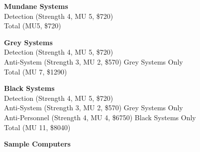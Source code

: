 \documentclass[11pt,twoside,a4paper]{article}
\newenvironment{local_enumerate}{
\begin{enumerate}
     \setlength{\itemsep}{1pt}
     \setlength{\parskip}{0pt}
     \setlength{\parsep}{0pt}}
{\end{enumerate}
}
\begin{document}
\begin{multicols}{2}
\begin{local_enumerate}
	\item \textbf{Mundane Systems}~\\
		Detection (Strength 4, MU 5, \$720)~\\
		Total (MU5, \$720)
	\item \textbf{Grey Systems}~\\
		Detection (Strength 4, MU 5, \$720)~\\
		Anti-System (Strength 3, MU 2, \$570) Grey Systems Only~\\
		Total (MU 7, \$1290)
	\item \textbf{Black Systems}~\\
		Detection (Strength 4, MU 5, \$720)~\\
		Anti-System (Strength 3, MU 2, \$570) Grey Systems Only~\\
		Anti-Personnel (Strength 4, MU 4, \$6750) Black Systems Only~\\
		Total (MU 11, \$8040)
\end{local_enumerate}

\vfill
\columnbreak

\textbf{\large Sample Computers} %


\end{multicols}
\end{document}
